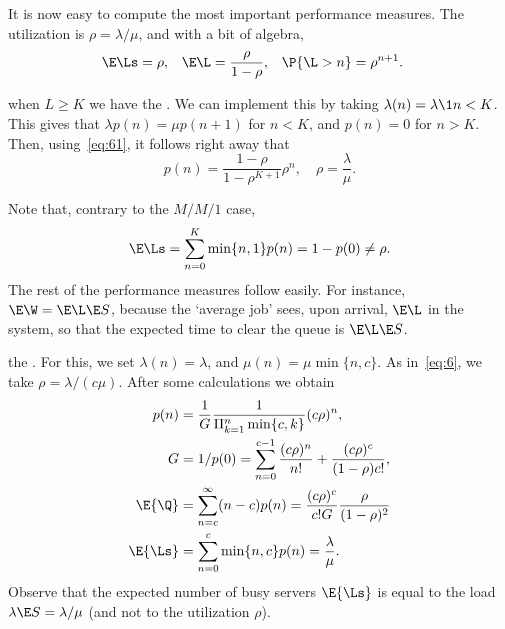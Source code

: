 It is now easy to compute the most important performance measures.
The utilization is $\rho=\lambda/\mu$, and with a bit of algebra,
\begin{align}\label{eq:el}
\E\Ls &= \rho, & \E \L &= \frac \rho{1-\rho}, & \P{\L> n} &= \rho^{n+1}.
\end{align}


 when $L\geq K$  we have the .
We can implement this by taking $\lambda(n) = \lambda \1{n < K}$.
This gives that $\lambda p(n) = \mu p(n+1)$ for $n<K$, and $p(n) = 0$ for $n>K$.
Then, using~\cref{eq:61}, it follows right away  that
 \begin{equation*}
p(n) = \frac{1-\rho}{1-\rho^{K+1}} \rho^n, \quad \rho = \frac{\lambda}{\mu}.
\end{equation*}

Note that, contrary to the $M/M/1$ case,
\begin{equation*}
\E\Ls = \sum_{n=0}^K \min\{n, 1\} p(n) = 1-p(0) \neq \rho.
\end{equation*}
The rest of the performance measures follow easily.
For instance, $\E\W = \E\L \E S$, because the `average job' sees, upon arrival, $\E\L$ in the system, so that the expected time to clear the queue is $\E\L \E S$.

 the .
For this, we set $\lambda(n) = \lambda$, and $\mu(n) = \mu \min\{n, c\}$.
As in~\cref{eq:6}, we take $\rho=\lambda/(c\mu)$.
After some calculations we obtain
\begin{subequations}
\begin{align}
p(n) &= \frac 1 {G} \frac{1}{\Pi_{k=1}^{n}\min\{c, k\}}(c\rho)^{n} , \label{eq:1}\\
G &=1/p(0) = \sum_{n=0}^{c-1} \frac{(c\rho)^n}{n!} + \frac{(c\rho)^c}{(1-\rho)c!}, \label{eq:501}\\
\E{\Q} &= \sum_{n=c}^\infty (n-c) p(n) = \frac{(c\rho)^c}{c! G}\frac{\rho}{(1-\rho)^2}\\
\E{\Ls} &= \sum_{n=0}^{c}\min\{n,c\} p(n)= \frac{\lambda}\mu.
\end{align}
\end{subequations}
Observe that the expected number of busy servers $\E{\Ls}$ is equal to the load $\lambda \E S=\lambda/\mu$ (and not to the utilization $\rho$).


